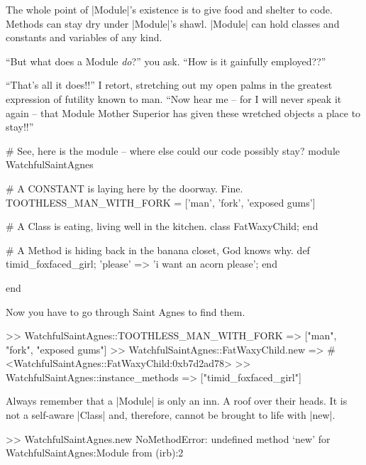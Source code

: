 \documentclass[12pt,twoside]{report}
\begin{document}
The whole point of \rubyinline|Module|'s existence is
to give food and shelter to code.  Methods can stay dry under
\rubyinline|Module|'s shawl.
\rubyinline|Module| can hold classes and constants and
variables of any kind.

``But what does a Module {\em do}?'' you ask.  ``How is it gainfully
employed??''

``That's all it does!!'' I retort, stretching out my open palms in the
greatest expression of futility known to man.  ``Now hear me -- for I
will never speak it again -- that Module Mother Superior has given
these wretched objects a place to stay!!''


\begin{rubycode}

 # See, here is the module -- where else could our code possibly stay?
 module WatchfulSaintAgnes

   # A CONSTANT is laying here by the doorway.  Fine.
   TOOTHLESS_MAN_WITH_FORK = ['man', 'fork', 'exposed gums']

   # A Class is eating, living well in the kitchen.
   class FatWaxyChild; end

   # A Method is hiding back in the banana closet, God knows why.
   def timid_foxfaced_girl; {'please' => 'i want an acorn please'}; end

 end

\end{rubycode}


Now you have to go through Saint Agnes to find them.


\begin{consolecode}

 >> WatchfulSaintAgnes::TOOTHLESS_MAN_WITH_FORK
 => ["man", "fork", "exposed gums"]
 >> WatchfulSaintAgnes::FatWaxyChild.new
 => #<WatchfulSaintAgnes::FatWaxyChild:0xb7d2ad78>
 >> WatchfulSaintAgnes::instance_methods
 => ["timid_foxfaced_girl"]

\end{consolecode}


Always remember that a \rubyinline|Module| is only an
inn.  A roof over their heads.  It is not a self-aware
\rubyinline|Class| and, therefore, cannot be brought
to life with \rubyinline|new|.


\begin{consolecode}

 >> WatchfulSaintAgnes.new
 NoMethodError: undefined method `new' for WatchfulSaintAgnes:Module
         from (irb):2

\end{consolecode}
\end{document}
